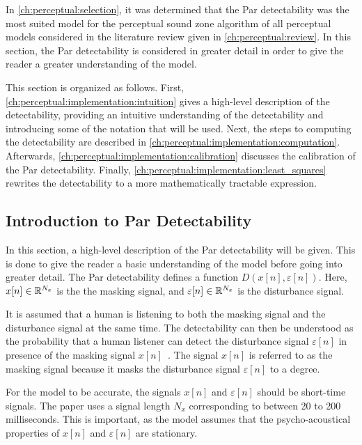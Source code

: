 In \autoref{ch:perceptual:selection}, it was determined that the Par detectability was the 
most suited model for the perceptual sound zone algorithm of all perceptual models considered in 
the literature review given in \autoref{ch:perceptual:review}.
In this section, the Par detectability is considered in greater detail in order to give the reader a greater
understanding of the model.

This section is organized as follows.
First, \autoref{ch:perceptual:implementation:intuition} gives a high-level description of the detectability, providing 
an intuitive understanding of the detectability and introducing some of the notation that will be used.
Next, the steps to computing the detectability are described in \autoref{ch:perceptual:implementation:computation}.
Afterwards, \autoref{ch:perceptual:implementation:calibration} discusses the calibration of the Par detectability.
Finally, \autoref{ch:perceptual:implementation:least_squares} rewrites the detectability to a more mathematically tractable expression.

\subsection{Introduction to Par Detectability}
\label{ch:perceptual:implementation:intuition}
In this section, a high-level description of the Par detectability will be given.
This is done to give the reader a basic understanding of the model before going into greater detail.
The Par detectability defines a function $D(x[n],\varepsilon[n])$.
Here, $x[n]\in\mathbb{R}^{N_x}$ is the the masking signal, 
and $\varepsilon[n]\in\mathbb{R}^{N_x}$ is the disturbance signal.

It is assumed that a human is listening to both the masking signal and the disturbance signal at the same time.
The detectability can then be understood as the probability that a human listener can detect the disturbance signal 
$\varepsilon[n]$ in presence of the masking signal $x[n]$~\cite{van2005perceptual}.
The signal $x[n]$ is referred to as the masking signal because it masks the disturbance signal 
$\varepsilon[n]$ to a degree.

For the model to be accurate, the signals $x[n]$ and $\varepsilon[n]$ should be short-time signals.
The paper uses a signal length $N_x$ corresponding to between 20 to 200 milliseconds.    
This is important, as the model assumes that the psycho-acoustical properties of $x[n]$ 
and $\varepsilon[n]$ are stationary.  

